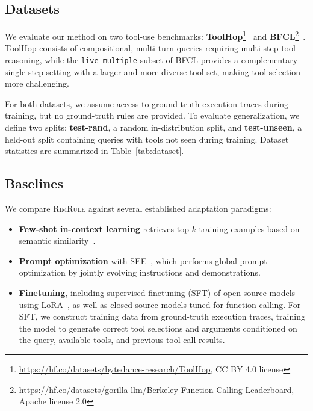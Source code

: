 \documentclass[11pt]{article}
\newcommand{\rand}{{test-rand}\xspace}
\newcommand{\unseen}{{test-unseen}\xspace}
\newcommand{\shortname}{\textsc{RimRule}\xspace}
\begin{document}
\subsection{Datasets}

We evaluate our method on two tool-use benchmarks: \textbf{ToolHop}\footnote{\url{https://hf.co/datasets/bytedance-research/ToolHop}, CC BY 4.0 license}~\cite{ye2025toolhop} and
\textbf{BFCL}\footnote{\url{https://hf.co/datasets/gorilla-llm/Berkeley-Function-Calling-Leaderboard}, Apache license 2.0}~\cite{berkeley-function-calling-leaderboard}. ToolHop consists of compositional,
multi-turn queries requiring multi-step tool reasoning, while the \texttt{live-multiple}
subset of BFCL provides a complementary single-step setting with a larger and more diverse
tool set, making tool selection more challenging.

For both datasets, we assume access to ground-truth execution traces during training, but no
ground-truth rules are provided. To evaluate generalization, we define two splits:
\textbf{\rand}, a random in-distribution split, and \textbf{\unseen}, a held-out split
containing queries with tools not seen during training. Dataset statistics are summarized
in Table~\ref{tab:dataset}.






\subsection{Baselines}


We compare \shortname against several established adaptation paradigms:
\begin{itemize}
    \item \textbf{Few-shot in-context learning} retrieves top-$k$ training examples based on
    semantic similarity~\citep{yizhe2021fewshot}.
    \item \textbf{Prompt optimization} with SEE~\citep{cui2025see}, which performs global prompt
    optimization by jointly evolving instructions and demonstrations.
    \item \textbf{Finetuning}, including supervised finetuning (SFT) of open-source models using
    LoRA~\citep{hu2021lora}, as well as closed-source models tuned for function calling.
    For SFT, we construct training data from ground-truth execution traces, training the model
    to generate correct tool selections and arguments conditioned on the query, available tools,
    and previous tool-call results.
\end{itemize}
\end{document}
